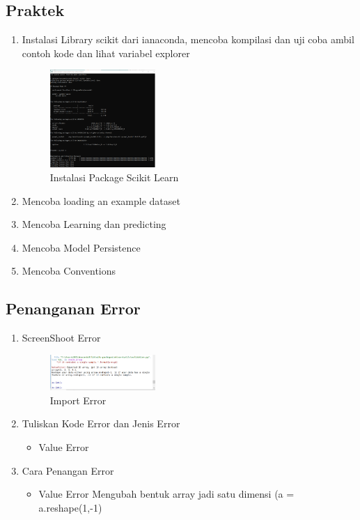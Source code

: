 \subsection{Praktek}
\begin{enumerate}
	\item Instalasi Library scikit dari ianaconda, mencoba kompilasi dan uji coba ambil contoh kode dan lihat variabel explorer
	\hfill\break
	\begin{figure}[H]
		\includegraphics[width=4cm]{figures/1174026/1/install.PNG}
		\centering
		\caption{Instalasi Package Scikit Learn}
	\end{figure}
	\item Mencoba loading an example dataset
	\hfill\break
	
	\item Mencoba Learning dan predicting
	\hfill\break
	
	\item Mencoba Model Persistence
	\hfill\break
	
	\item Mencoba Conventions
	\hfill\break
	
\end{enumerate}
\subsection{Penanganan Error}
\begin{enumerate}
	\item ScreenShoot Error
	\begin{figure}[H]
		\includegraphics[width=4cm]{figures/1174026/1/error.png}
		\centering
		\caption{Import Error}
	\end{figure}
	\item Tuliskan Kode Error dan Jenis Error
	\begin{itemize}
		\item Value Error
	\end{itemize}
	\item Cara Penangan Error
	\begin{itemize}
		\item Value Error
		\hfill\break
		Mengubah bentuk array jadi satu dimensi (a = a.reshape(1,-1)   
	\end{itemize}
\end{enumerate}
